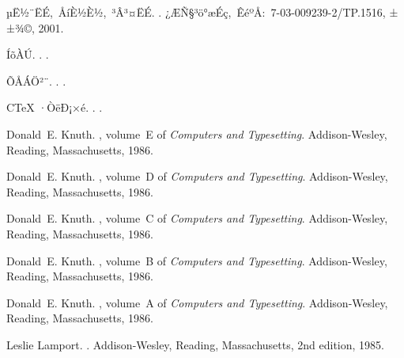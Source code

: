 
\begin{thebibliography}{10}

{µË½¨ËÉ,~ÅíÈ½È½,~³Â³¤ËÉ}.
.
\newblock ¿ÆÑ§³ö°æÉç,~ÊéºÅ:~7-03-009239-2/TP.1516, ±±¾©, 2001.

ÍõÀÚ.
.
.

ÕÅÁÖ²¨.
.
.

C\TeX{} ·­ÒëÐ¡×é.
.
.

Donald~E. Knuth.
, volume~E of {\em Computers and
  Typesetting}.
\newblock Addison-Wesley, Reading, Massachusetts, 1986.

Donald~E. Knuth.
, volume~D of {\em Computers and
  Typesetting}.
\newblock Addison-Wesley, Reading, Massachusetts, 1986.

Donald~E. Knuth.
, volume~C of {\em Computers and
  Typesetting}.
\newblock Addison-Wesley, Reading, Massachusetts, 1986.

Donald~E. Knuth.
, volume~B of {\em Computers and
  Typesetting}.
\newblock Addison-Wesley, Reading, Massachusetts, 1986.

Donald~E. Knuth.
, volume~A of {\em Computers and Typesetting}.
\newblock Addison-Wesley, Reading, Massachusetts, 1986.

Leslie Lamport.
.
\newblock Addison-Wesley, Reading, Massachusetts, 2nd edition, 1985.

\end{thebibliography}
